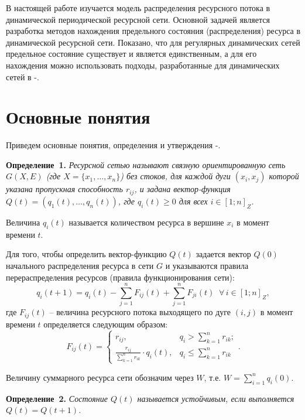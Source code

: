 \documentclass[a4paper,12pt]{article}
\begin{document}
В настоящей работе изучается модель распределения ресурсного потока в динамической периодической ресурсной сети. Основной задачей является разработка методов нахождения предельного состояния (распределения) ресурса в динамической ресурсной сети. Показано, что для регулярных динамических сетей предельное состояние существует и является единственным, а для его нахождения можно использовать подходы, разработанные для динамических сетей в \cite{SvSkor:ErusSkor}-\cite{SvSkor:Kuzm}.

\section{Основные понятия}

\indent

Приведем основные понятия, определения и утверждения \cite{SvSkor:ErusSkor}-\cite{SvSkor:Zhil2}.

{\bf Определение~1. }{\it 
Ресурсной сетью называют связную ориентированную сеть $G(X,E)$ (где $X=\{x_1,\dots,x_n\}$) без стоков, для каждой дуги $(x_i,x_j)$ которой указана пропускная способность $r_{ij}$, и задана вектор-функция ${Q}(t)=(q_1(t),\dots,q_n(t))$, где  $q_i(t)\geq 0$ для всех $i\in [1;n]_Z$.
}

Величина $q_i(t)$ называется количеством ресурса в вершине $x_i$ в момент времени $t$.

Для того, чтобы определить вектор-функцию ${Q}(t)$ задается вектор ${Q}(0)$ начального распределения ресурса в сети $G$ и указываются правила перераспределения ресурсов (правила функционирования сети):
\begin{equation}
\label{eq:mainOld}
q_i(t+1)=q_i(t)-\sum\limits_{j=1}^n F_{ij}(t)+\sum\limits_{j=1}^n F_{ji}(t)\;\; \forall\, i\in[1;n]_Z,
\end{equation}
где $F_{ij}(t)$ – величина ресурсного потока выходящего по дуге $(i,j)$ в момент времени $t$ определяется следующим образом:
$$F_{ij}(t)=\left\{
\begin{array}{ll}
r_{ij},& q_i>\sum\limits_{k=1}^n r_{ik};\\
\displaystyle \frac{r_{ij}}{\sum\limits_{k=1}^n r_{ik}}\cdot q_i(t),& q_i\leq\sum\limits_{k=1}^n r_{ik}
\end{array}
\right..$$

Величину суммарного ресурса сети обозначим через $W$, т.е. $W=\sum\limits_{i=1}^nq_i(0)$.

{\bf Определение~2. }{\it 
Состояние ${Q}(t)$ называется устойчивым, если выполняется ${Q}(t)={Q}(t+1)$.
}
\end{document}
